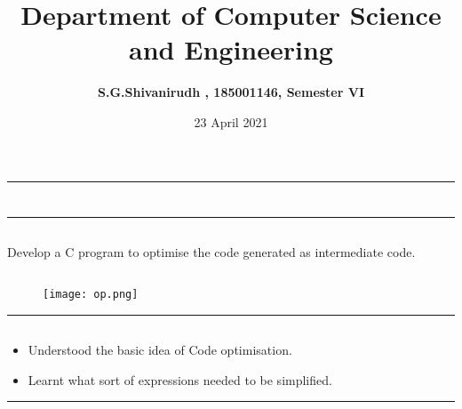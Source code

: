 \documentclass[12pt,letterpaper]{article}
\title{\textbf{Department of Computer Science and Engineering}}
\author{\textbf{S.G.Shivanirudh , 185001146, Semester VI }}
\date{23 April 2021}
\begin{document}
\maketitle
\hrule
\section*{}
\hrule 
\bigskip\bigskip

\subsection*{}

\subsection*{}
\begin{flushleft}
    Develop a C program to optimise the code generated as intermediate code. 
\end{flushleft}

\subsection*{}
\begin{flushleft}

\end{flushleft}

\newpage
\subsection*{}
\begin{flushleft}
    
\end{flushleft}
\newpage
\subsection*{}
\begin{figure}[h]
    \centering
    \texttt{[image: op.png]}
\end{figure}
\hrule
\subsection*{}
\begin{flushleft}
    \renewcommand{\labelitemi}{$\textendash$}
    \begin{itemize}
        \item Understood the basic idea of Code optimisation.
        \item Learnt what sort of expressions needed to be simplified.
    \end{itemize}
\end{flushleft}
\hrule
\end{document}
